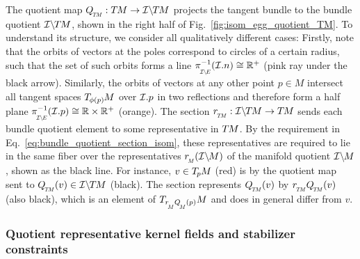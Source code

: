 The quotient map $\QTM: \TM \to \ITM$ projects the tangent bundle to the bundle quotient $\mathcal{I}\backslash\mkern-1.5mu T\mkern-1.5mu M$, shown in the right half of Fig.~\ref{fig:isom_egg_quotient_TM}.
To understand its structure, we consider all qualitatively different cases:
Firstly, note that the orbits of vectors at the poles correspond to circles of a certain radius, such that the set of such orbits forms a line $\piIE^{-1}(\I.n) \cong \R^+$ (pink ray under the black arrow).
Similarly, the orbits of vectors at any other point $p\in M$ intersect all tangent spaces $T_{\mkern-1.5mu \phi(p)}\mkern-1muM$ over $\mathcal{I}.p$ in two reflections and therefore form a half plane $\piIE^{-1}(\I.p) \cong \R\times\R^+$ (orange).
The section $\rTM: \ITM \to \TM$ sends each bundle quotient element to some representative in $T\mkern-1.5muM$.
By the requirement in Eq.~\eqref{eq:bundle_quotient_section_isom}, these representatives are required to lie in the same fiber over the representatives $\rM(\IM)$ of the manifold quotient $\mathcal{I}\backslash\mkern-1.5mu M$, shown as the black line.
For instance, $v\in T_{\mkern-1.5mu p}\mkern-.5muM$ (red) is by the quotient map sent to $\QTM(v)\in \ITM$ (black).
The section represents $\QTM(v)$ by $\rTM\QTM(v)$ (also black), which is an element of $T_{\rM\QM(p)}M$ and does in general differ from $v$.



















\subsubsection{Quotient representative kernel fields and stabilizer constraints}
\label{sec:quotient_kernels_stabilizers}


